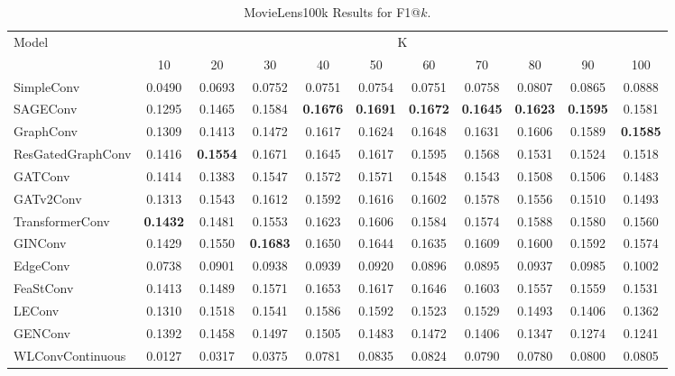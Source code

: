 \documentclass[bst/sn-nature]{sn-jnl}
\begin{document}
\begin{appendices}
\begin{table}[htbp]
    \centering 
    \begin{tabular}{|l|*{10}{c|}}
    \hline
    \multirow{2}{*}{Model} & \multicolumn{10}{c|}{K} \\
    \hhline{~*{10}{|-}|}
                             & 10    & 20    & 30    & 40    & 50    & 60    & 70    & 80    & 90    & 100   \\ \hline
    \rowcolor[gray]{0.9} SimpleConv               & 0.0490 & 0.0693 & 0.0752 & 0.0751 & 0.0754 & 0.0751 & 0.0758 & 0.0807 & 0.0865 & 0.0888 \\ 
    SAGEConv                 & 0.1295 & 0.1465 & 0.1584 & \textbf{0.1676} & \textbf{0.1691} & \textbf{0.1672} & \textbf{0.1645} & \textbf{0.1623} & \textbf{0.1595} & 0.1581 \\ 
    \rowcolor[gray]{0.9} GraphConv                & 0.1309 & 0.1413 & 0.1472 & 0.1617 & 0.1624 & 0.1648 & 0.1631 & 0.1606 & 0.1589 & \textbf{0.1585} \\ 
    ResGatedGraphConv        & 0.1416 & \textbf{0.1554} & 0.1671 & 0.1645 & 0.1617 & 0.1595 & 0.1568 & 0.1531 & 0.1524 & 0.1518 \\ 
    \rowcolor[gray]{0.9} GATConv                  & 0.1414 & 0.1383 & 0.1547 & 0.1572 & 0.1571 & 0.1548 & 0.1543 & 0.1508 & 0.1506 & 0.1483 \\ 
    GATv2Conv                & 0.1313 & 0.1543 & 0.1612 & 0.1592 & 0.1616 & 0.1602 & 0.1578 & 0.1556 & 0.1510 & 0.1493 \\ 
    \rowcolor[gray]{0.9} TransformerConv          & \textbf{0.1432} & 0.1481 & 0.1553 & 0.1623 & 0.1606 & 0.1584 & 0.1574 & 0.1588 & 0.1580 & 0.1560 \\ 
    GINConv                  & 0.1429 & 0.1550 & \textbf{0.1683} & 0.1650 & 0.1644 & 0.1635 & 0.1609 & 0.1600 & 0.1592 & 0.1574 \\ 
    \rowcolor[gray]{0.9} EdgeConv                 & 0.0738 & 0.0901 & 0.0938 & 0.0939 & 0.0920 & 0.0896 & 0.0895 & 0.0937 & 0.0985 & 0.1002 \\ 
    FeaStConv                & 0.1413 & 0.1489 & 0.1571 & 0.1653 & 0.1617 & 0.1646 & 0.1603 & 0.1557 & 0.1559 & 0.1531 \\ 
    \rowcolor[gray]{0.9} LEConv                   & 0.1310 & 0.1518 & 0.1541 & 0.1586 & 0.1592 & 0.1523 & 0.1529 & 0.1493 & 0.1406 & 0.1362 \\ 
    GENConv                  & 0.1392 & 0.1458 & 0.1497 & 0.1505 & 0.1483 & 0.1472 & 0.1406 & 0.1347 & 0.1274 & 0.1241 \\ 
    \rowcolor[gray]{0.9} WLConvContinuous         & 0.0127 & 0.0317 & 0.0375 & 0.0781 & 0.0835 & 0.0824 & 0.0790 & 0.0780 & 0.0800 & 0.0805 \\ \hline
    \end{tabular}
    \caption{MovieLens100k Results for F1@$k$.}
    \label{tab:f1}
\end{table}


\end{appendices}
\end{document}
